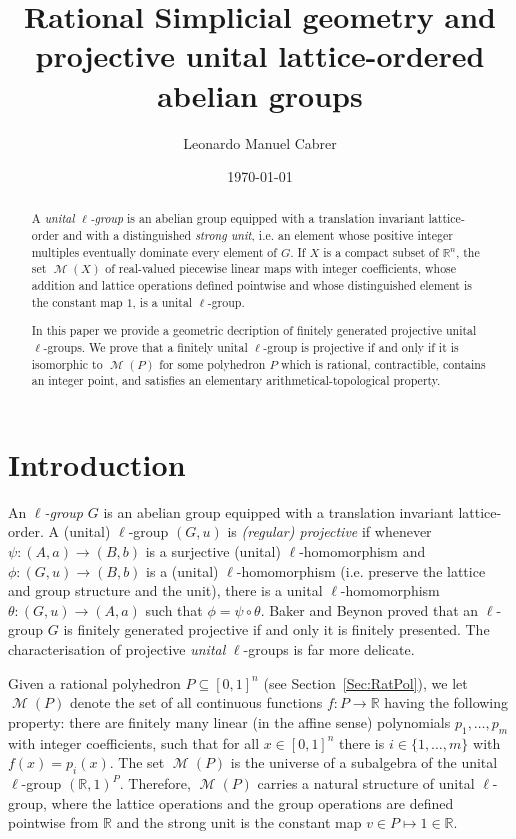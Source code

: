 \documentclass[reqno, draft]{amsart}
\title[Projective unital $\ell$-groups]{Rational Simplicial geometry and projective unital
lattice-ordered abelian groups}
\author[L.M.Cabrer]{Leonardo Manuel Cabrer}
\date{\today}
\theoremstyle{definition}
\begin{document}
\begin{abstract}
A {\it unital $\ell$-group} is an abelian group equipped
 with a translation invariant lattice-order 
and with a distinguished {\it strong unit}, 
i.e. an element whose positive
integer multiples eventually dominate every element of $G$.
If $X$ is a compact subset  of ${\mathbb{R}}^n$, 
the set $\operatorname{\mathscr M}(X)$ of real-valued piecewise linear maps with integer 
coefficients, 
whose addition and lattice operations defined pointwise and whose distinguished element is the constant map $1$, 
is a  unital $\ell$-group. 

In this paper we provide a geometric decription of finitely generated projective unital $\ell$-groups. 
We prove that a finitely unital $\ell$-group is  projective 
if and only if it is isomorphic to $\operatorname{\mathscr M}(P)$ for some polyhedron $P$ which is rational,
contractible, contains an integer point, and satisfies an elementary
arithmetical-topological property.
\end{abstract}

\maketitle

\section{Introduction}

An {\it $\ell$-group} $G$ is an abelian group equipped with
a 
translation invariant lattice-order.
A (unital) $\ell$-group $(G,u)$ is {\it (regular) projective} 
if whenever $\psi\colon (A,a)\to(B,b)$ 
is a surjective (unital) $\ell$-homomorphism 
and $\phi\colon (G,u)\to(B,b)$ is a (unital) $\ell$-homomorphism 
(i.e. preserve the lattice and group structure and the unit), there
is a unital $\ell$-homomorphism $\theta\colon (G,u)\to(A,a)$ 
such that $\phi= \psi \circ \theta$.
Baker \cite{Bak1968} and Beynon \cite{Bey1977a}
proved that an $\ell$-group $G$
 is finitely generated projective 
if and only  it is finitely presented.
The characterisation of projective {\it unital} $\ell$-groups 
is far more delicate.

Given a rational polyhedron $P\subseteq[0,1]^n$ (see Section~\ref{Sec:RatPol}), 
we let \ $\operatorname{\mathscr M}(P)$ denote the set of all continuous functions
$f\colon P\to {\mathbb{R}}$ 
having the following property: there are finitely many linear
(in the affine sense) polynomials $p_{1},\ldots,p_{m}$ with integer coefficients, 
such that
for all $x\in [0,1]^{n}$ there is $i\in \{1,\ldots,m\}$ with
$f(x)=p_{i}(x)$.
The set $\operatorname{\mathscr M}(P)$ is the universe of 
a subalgebra of the unital $\ell$-group  $({\mathbb{R}},1)^{P}$.
Therefore,  $\operatorname{\mathscr M}(P)$ carries a natural structure of 
unital $\ell$-group, 
where the lattice operations and the group operations 
are defined pointwise from 
${\mathbb{R}}$ and the strong unit is the constant map 
$v\in P\mapsto1\in{\mathbb{R}}$. 
\end{document}
